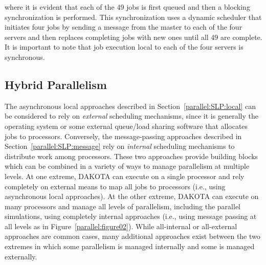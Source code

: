 where it is evident that each of the 49 jobs is first queued and then
a blocking synchronization is performed.  This synchronization uses a
dynamic scheduler that initiates four jobs by sending a message from
the master to each of the four servers and then replaces completing
jobs with new ones until all 49 are complete.  It is important to note
that job execution local to each of the four servers is synchronous.


\subsection{Hybrid Parallelism}\label{parallel:SLP:hybrid}

The asynchronous local approaches described in
Section~\ref{parallel:SLP:local} can be considered to rely on
\emph{external} scheduling mechanisms, since it is generally the
operating system or some external queue/load sharing software that
allocates jobs to processors. Conversely, the message-passing
approaches described in Section~\ref{parallel:SLP:message} rely on
\emph{internal} scheduling mechanisms to distribute work among
processors. These two approaches provide building blocks which can be
combined in a variety of ways to manage parallelism at multiple
levels. At one extreme, DAKOTA can execute on a single processor and
rely completely on external means to map all jobs to processors (i.e.,
using asynchronous local approaches). At the other extreme, DAKOTA can
execute on many processors and manage all levels of parallelism,
including the parallel simulations, using completely internal
approaches (i.e., using message passing at all levels as in
Figure~\ref{parallel:figure02}). While all-internal or all-external
approaches are common cases, many additional approaches exist between
the two extremes in which some parallelism is managed internally and
some is managed externally.

